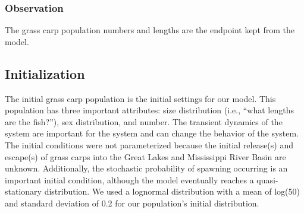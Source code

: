 \documentclass{article}[12pt]
\begin{document}

\subsubsection{Observation}

The grass carp population numbers and lengths are the endpoint kept from the model.  


\subsection{Initialization}\label{sec:init}

The initial grass carp population is the initial settings for our model.
This population has three important attributes: size distribution (i.e., ``what lengths are the fish?''), sex distribution, and number.
The transient dynamics of the system are important for the system and can change the behavior of the system.
The initial conditions were not parameterized because the initial release(s) and escape(s) of grass carps into the Great Lakes and Mississippi River Basin are unknown. 
Additionally, the stochastic probability of spawning occurring is an important initial condition, although the model eventually reaches a quasi-stationary distribution.  
We used a lognormal distribution with a mean of log(50) and standard deviation of 0.2 for our population's initial distribution. 


\end{document}
